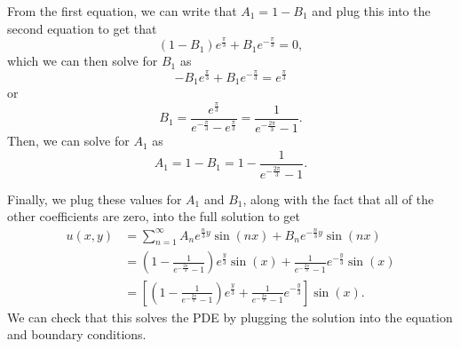 \documentclass{ximera}
\begin{document}
\begin{exampleSol}
    From the first equation, we can write that $A_1 = 1 - B_1$ and plug this into the second equation to get that
    \[ 
        (1 - B_1)e^{\frac{\pi}{3}} + B_1 e^{-\frac{\pi}{3}} = 0,
    \] 
    which we can then solve for $B_1$ as
    \[
        -B_1e^{\frac{\pi}{3}} + B_1e^{-\frac{\pi}{3}} = e^{\frac{\pi}{3}}
    \] 
    or
    \[ 
        B_1 = \frac{e^{\frac{\pi}{3}}}{e^{-\frac{\pi}{3}} - e^{\frac{\pi}{3}}} = \frac{1}{e^{-\frac{2\pi}{3}} - 1}. 
    \]
    Then, we can solve for $A_1$ as
    \[ 
        A_1 = 1 - B_1 = 1 - \frac{1}{e^{-\frac{2\pi}{3}} - 1}. 
    \]
    
    Finally, we plug these values for $A_1$ and $B_1$, along with the fact that all of the other coefficients are zero, into the full solution to get
    \[
        \begin{split}
            u(x,y) &= \sum_{n=1}^\infty A_n e^{\frac{n}{3}y}\sin(nx) + B_n e^{-\frac{n}{3}y}\sin(nx) \\
            &= \left(1 - \frac{1}{e^{-\frac{2\pi}{3}} - 1} \right)e^{\frac{y}{3}}\sin(x) + \frac{1}{e^{-\frac{2\pi}{3}} - 1}e^{-\frac{y}{3}}\sin(x) \\
            &= \left[\left(1 - \frac{1}{e^{-\frac{2\pi}{3}} - 1} \right)e^{\frac{y}{3}}+ \frac{1}{e^{-\frac{2\pi}{3}} - 1}e^{-\frac{y}{3}}\right]\sin(x).
        \end{split}
    \]
    We can check that this solves the PDE by plugging the solution into the equation and boundary conditions.
\end{exampleSol}
\end{document}
